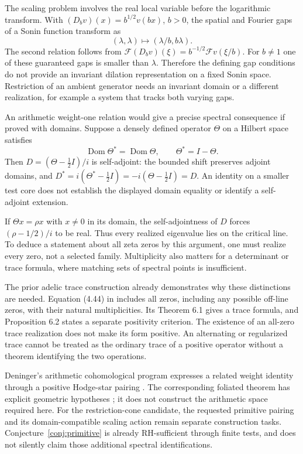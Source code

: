 \documentclass[11pt,letterpaper]{article}
\theoremstyle{definition}
\theoremstyle{remark}
\newcommand{\Dom}{\operatorname{Dom}}
\begin{document}
The scaling problem involves the real local variable before the
logarithmic transform. With $(D_bv)(x)=b^{1/2}v(bx)$, $b>0$,
the spatial and Fourier gaps of a Sonin function transform as
\begin{equation}
 (\lambda,\lambda)\longmapsto(\lambda/b,b\lambda).
 \label{eq:gaps}
\end{equation}
The second relation follows from
$\mathscr F(D_bv)(\xi)=b^{-1/2}\mathscr Fv(\xi/b)$.
For $b\ne1$ one of these guaranteed gaps is smaller than
$\lambda$. Therefore the defining gap conditions do not
provide an invariant dilation representation on a fixed
Sonin space. Restriction of an ambient generator needs an
invariant domain or a different realization, for example a
system that tracks both varying gaps.

An arithmetic weight-one relation would give a precise spectral
consequence if proved with domains. Suppose a densely defined
operator $\Theta$ on a Hilbert space satisfies
\begin{equation}
 \Dom\Theta^*=\Dom\Theta,\qquad \Theta^*=I-\Theta.
 \label{eq:adjoint}
\end{equation}
Then $D=(\Theta-\tfrac12I)/i$ is self-adjoint: the bounded
shift preserves adjoint domains, and
$D^*=i(\Theta^*-\tfrac12I)=-i(\Theta-\tfrac12I)=D$.
An identity on a smaller test core does not establish the
displayed domain equality or identify a self-adjoint extension.

If $\Theta x=\rho x$ with $x\ne0$ in its domain, the
self-adjointness of $D$ forces $(\rho-1/2)/i$ to be real.
Thus every realized eigenvalue lies on the critical line.
To deduce a statement about all zeta zeros by this argument,
one must realize every zero, not a selected family. Multiplicity
also matters for a determinant or trace formula, where matching
sets of spectral points is insufficient.

The prior adelic trace construction already demonstrates why
these distinctions are needed. Equation (4.44) in \cite{CCMar}
includes all zeros, including any possible off-line zeros,
with their natural multiplicities. Its Theorem 6.1 gives a
trace formula, and Proposition 6.2 states a separate positivity
criterion. The existence of an all-zero trace realization does
not make its form positive. An alternating or regularized trace
cannot be treated as the ordinary trace of a positive operator
without a theorem identifying the two operations.

Deninger's arithmetic cohomological program expresses a related
weight identity through a positive Hodge-star pairing
\cite[Section 3]{D05}. The corresponding foliated theorem has
explicit geometric hypotheses \cite[Theorem 4.1]{D05}; it does
not construct the arithmetic space required here. For the
restriction-cone candidate, the requested primitive pairing
and its domain-compatible scaling action remain separate
construction tasks. Conjecture~\ref{conj:primitive} is already
RH-sufficient through finite tests, and does not silently claim
those additional spectral identifications.
\end{document}

